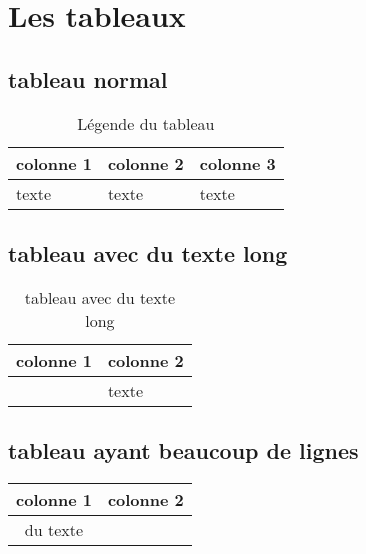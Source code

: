 
\section{Les tableaux}


\subsection{tableau normal}

\begin{table}[H]
	\centering
	\caption{Légende du tableau}	
	\label{tab:label_tableau}
	\begin{tabular}{|l|l|l|}
		\hline \textbf{colonne 1} & \textbf{colonne 2} & \textbf{colonne 3} \\
		
		\hline texte & texte & texte \\
		\hline 
	\end{tabular}
\end{table}


\subsection{tableau avec du texte long}

\begin{table}[H]
	\centering
	\caption{tableau avec du texte long}	
	\label{tab:label_tableau_texte_long}
	\begin{tabular}{|p{12cm}|p{3cm}|}
		\hline \textbf{colonne 1} & \textbf{colonne 2} \tabularnewline
		
		\hline 
			\raggedright \lipsum[1] & 
			\centering texte 
			\tabularnewline
		\hline 
	\end{tabular}
\end{table}


\subsection{tableau ayant beaucoup de lignes}




\begin{longtable}{|c|c|}
	
	\hline \textbf{colonne 1} & \textbf{colonne 2} \\ 
	\hline
	\endfirsthead
	
	
	
	
	\hline 	du texte &	\\ 
	\hline

\end{longtable}



